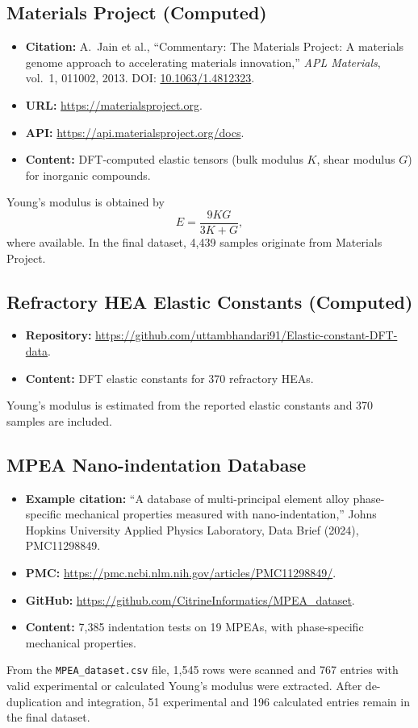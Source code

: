 \documentclass[12pt]{article}
\begin{document}
\subsection{Materials Project (Computed)}
\begin{itemize}
  \item \textbf{Citation:} A.~Jain et al., ``Commentary: The Materials Project: A materials genome approach to accelerating materials innovation,'' \emph{APL Materials}, vol.~1, 011002, 2013. DOI: \href{https://doi.org/10.1063/1.4812323}{10.1063/1.4812323}.
  \item \textbf{URL:} \url{https://materialsproject.org}.
  \item \textbf{API:} \url{https://api.materialsproject.org/docs}.
  \item \textbf{Content:} DFT-computed elastic tensors (bulk modulus $K$, shear modulus $G$) for inorganic compounds.
\end{itemize}
Young's modulus is obtained by
\[
E = \frac{9 K G}{3 K + G},
\]
where available. In the final dataset, 4,439 samples originate from Materials Project.

\subsection{Refractory HEA Elastic Constants (Computed)}
\begin{itemize}
  \item \textbf{Repository:} \url{https://github.com/uttambhandari91/Elastic-constant-DFT-data}.
  \item \textbf{Content:} DFT elastic constants for 370 refractory HEAs.
\end{itemize}
Young's modulus is estimated from the reported elastic constants and 370 samples are included.

\subsection{MPEA Nano-indentation Database}
\begin{itemize}
  \item \textbf{Example citation:} ``A database of multi-principal element alloy phase-specific mechanical properties measured with nano-indentation,'' Johns Hopkins University Applied Physics Laboratory, Data Brief (2024), PMC11298849.
  \item \textbf{PMC:} \url{https://pmc.ncbi.nlm.nih.gov/articles/PMC11298849/}.
  \item \textbf{GitHub:} \url{https://github.com/CitrineInformatics/MPEA_dataset}.
  \item \textbf{Content:} 7,385 indentation tests on 19 MPEAs, with phase-specific mechanical properties.
\end{itemize}
From the \texttt{MPEA\_dataset.csv} file, 1,545 rows were scanned and 767 entries with valid experimental or calculated Young's modulus were extracted. After de-duplication and integration, 51 experimental and 196 calculated entries remain in the final dataset.
\end{document}
